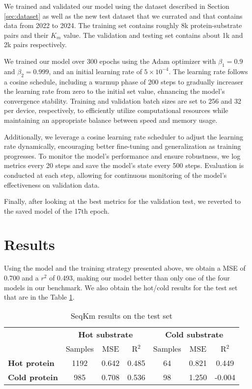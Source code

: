 We trained and validated our model using the dataset described in Section \ref{sec:dataset} as well as the new
test dataset that we currated and that contains data from 2022 to 2024. The training set contains roughly 8k
protein-substrate pairs and their $K_m$ value. The validation and testing set contains about 1k and 2k pairs
respectively. 

We trained our model over 300 epochs using the Adam optimizer with $\beta_1=0.9$ and $\beta_2=0.999$, and an initial
learning rate of $5\times10^{-4}$. The learning rate follows a cosine schedule, including a warmup phase of 200
steps to gradually increaser the learning rate from zero to the initial set value, ehnancing the model's convergence
stability. Training and validation batch sizes are set to 256 and 32 per device, respectively, to efficiently
utilize computational resources while maintaining an appropriate balance between speed and memory usage. 

Additionally, we leverage a cosine learning rate scheduler to adjust the learning rate dynamically, 
encouraging better fine-tuning and generalization as training progresses. To monitor the model's performance 
and ensure robustness, we log metrics every 20 steps and save the model's state every 500 steps. 
Evaluation is conducted at each step, allowing for continuous monitoring of the model's effectiveness on 
validation data. 

Finally, after looking at the best metrics for the validation test, we reverted to the saved model of the
 17th epoch. 

 \section{Results}

 Using the model and the training strategy presented above, we obtain a MSE of 0.700 and a $r^2$ of 0.493, making our model better than only one of the four models in our benchmark. We also obtain the hot/cold results for the test set that are in the Table \ref{tab:seqkm_results}.

 \begin{table}[ht]
  \centering
  \begin{tabular}{lcccccc}
  \hline
   & \multicolumn{3}{c}{\textbf{Hot substrate}} & \multicolumn{3}{c}{\textbf{Cold substrate}} \\
   & Samples & MSE & R\(^2\) & Samples & MSE & R\(^2\) \\ \hline
  \textbf{Hot protein}  & 1192 & 0.642 & 0.485 & 64 & 0.821 & 0.449 \\
  \textbf{Cold protein} & 985 & 0.708 & 0.536 & 98 & 1.250 & -0.004 \\ \hline
  \end{tabular}
  \caption{SeqKm results on the test set}
  \label{tab:seqkm_results}
 \end{table}

